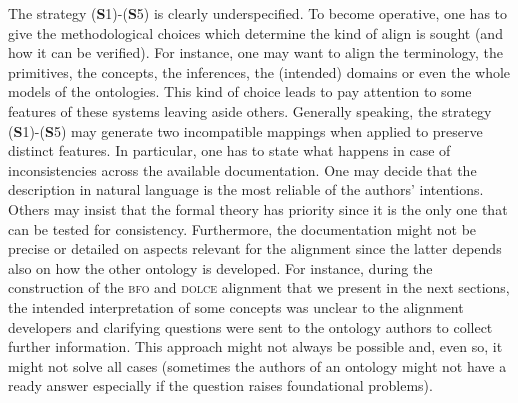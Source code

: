 \documentclass[ao]{iosart2x}
\newcommand{\dolce}{{\textsc{dolce}}}
\newcommand{\bfo}{{\textsc{bfo}}}
\begin{document}
The strategy ({\bf S}1)-({\bf S}5) is clearly underspecified. To become operative, one has to give the methodological choices which determine the kind of align is sought (and how it can be verified). For instance, one may want to align the terminology, the primitives, the concepts, the inferences, the (intended) domains or even the whole models of the ontologies. This kind of choice leads to pay attention to some features of these systems leaving aside others. Generally speaking, the strategy ({\bf S}1)-({\bf S}5) may generate two incompatible mappings when applied to preserve distinct features.
In particular, one has to state what happens in case of inconsistencies across the available documentation. One may decide that the description in natural language is the most reliable of the authors' intentions. Others may insist that the formal theory has priority since it is the only one that can be tested for consistency. Furthermore, the documentation might not be precise or detailed on aspects relevant for the alignment since the latter depends also on how the other ontology is developed. For instance, during the construction of the {\bfo} and {\dolce} alignment that we present in the next sections, the intended interpretation of some concepts was unclear to the alignment developers and clarifying questions were sent to the ontology authors to collect further information. This approach might not always be possible and, even so, it might not solve all cases (sometimes the authors of an ontology might not have a ready answer especially if the question raises foundational problems). %
\end{document}
